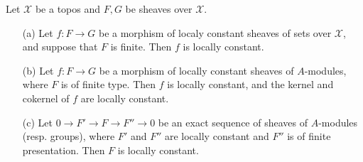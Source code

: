 \begin{lemma}\label{topos locally constant sheaf morphism prop}
Let $\mathcal{X}$ be a topos and $F,G$ be sheaves over $\mathcal{X}$.
\begin{enumerate}
    \item[(a)] Let $f:F\to G$ be a morphism of localy constant sheaves of sets over $\mathcal{X}$, and suppose that $F$ is finite. Then $f$ is locally constant.
    \item[(b)] Let $f:F\to G$ be a morphism of locally constant sheaves of $A$-modules, where $F$ is of finite type. Then $f$ is locally constant, and the kernel and cokernel of $f$ are locally constant.
    \item[(c)] Let $0\to F'\to F\to F''\to 0$ be an exact sequence of sheaves of $A$-modules (resp. groups), where $F'$ and $F''$ are locally constant and $F''$ is of finite presentation. Then $F$ is locally constant.
\end{enumerate}
\end{lemma}
